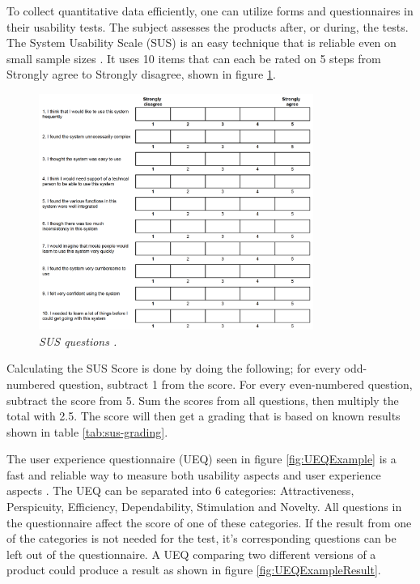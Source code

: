 To collect quantitative data efficiently, one can utilize forms and questionnaires in their usability tests. The subject assesses the products after, or during, the tests. 
The System Usability Scale (SUS) is an easy technique that is reliable even on small sample sizes \cite{SUSUsability}. It uses 10 items that can each be rated on 5 steps from Strongly agree to Strongly disagree, shown in figure \ref{fig:sus-questions-example}. 

\begin{figure}[ht] 
    \centering 
    \includegraphics[width=0.8\textwidth]{img/sus_questions_example.png}
    \hfill
    \caption{\textit{SUS questions \cite{SUSUsability}.}}
    \label{fig:sus-questions-example}
\end{figure}

Calculating the SUS Score is done by doing the following; for every odd-numbered question, subtract 1 from the score. For every even-numbered question, subtract the score from 5. Sum the scores from all questions, then multiply the total with 2.5. The score will then get a grading that is based on known results shown in table \ref{tab:sus-grading}.



The user experience questionnaire (UEQ) seen in figure \ref{fig:UEQExample} is a fast and reliable way to measure both usability aspects and user experience aspects \cite{UEQOnline}. 
The UEQ can be separated into 6 categories: Attractiveness, Perspicuity, Efficiency, Dependability, Stimulation and Novelty. 
All questions in the questionnaire affect the score of one of these categories. 
If the result from one of the categories is not needed for the test, it’s corresponding questions can be left out of the questionnaire. A UEQ comparing two different versions of a product could produce a result as shown in figure \ref{fig:UEQExampleResult}. 


